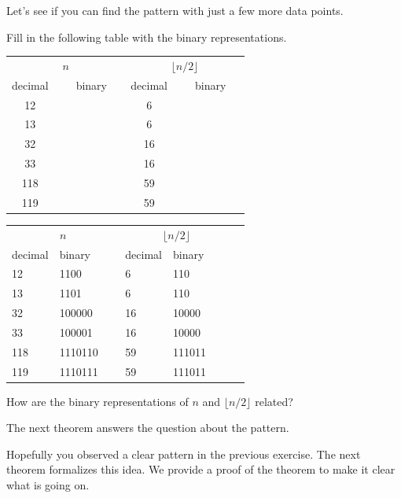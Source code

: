 Let's see if you can find the pattern with just a few more data points.

\begin{exer}
Fill in the following table with the binary representations.
\begin{center}
{\Large
\begin{tabular}{|c|c|c|c|}
\hline
\multicolumn{2}{|c|}{$n$}&
\multicolumn{2}{c|}{$\lfloor n/2\rfloor$}\\
decimal&\, \, \, binary\, \, \, &decimal&\, \, \, binary\, \, \, \\
\hline
\hline
12&&6&\\
\hline
13&&6&\\
\hline
32&&16&\\
\hline
33&&16&\\
\hline
118&&59&\\
\hline
119&&59&\\
\hline
\end{tabular}
}
\end{center}

\begin{answer}
\begin{tabular}{|l|l|l|l|l|}
\hline
\multicolumn{2}{|c|}{$n$}&
\multicolumn{2}{c|}{$\lfloor n/2\rfloor$}\\
decimal&binary\, \, \, \, \, &decimal&binary\, \, \, \, \,\\
\hline
\hline
12&1100&6&110\\
\hline
13&1101&6&110\\
\hline
32&100000&16&10000\\
\hline
33&100001&16&10000\\
\hline
118&1110110&59&111011\\
\hline
119&1110111&59&111011\\
\hline
\end{tabular}
\end{answer}
\end{exer}

\begin{ques}
How are the binary representations of 
$n$ and $\lfloor n/2\rfloor$ related?

\noindent
\answerlinetwo
\begin{answer}
The next theorem answers the question about the pattern.
\end{answer}
\end{ques}

Hopefully you observed a clear pattern in the previous exercise.  The next theorem formalizes 
this idea.  We provide a proof of the theorem to make it clear what is going on.


